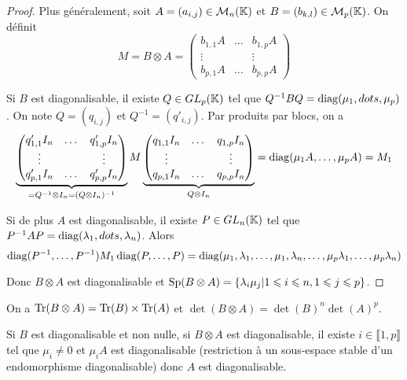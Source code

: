\documentclass[12pt]{article}
\begin{document}
\begin{proof}
	Plus généralement, soit $A=(a_{i,j})\in\mathcal{M}_{n}(\mathbb{K})$ et $B=(b_{k,l})\in\mathcal{M}_{p}(\mathbb{K})$. On définit 
	\begin{equation}
		M=B\otimes A=
		\begin{pmatrix}
			b_{1,1}A&\dots&b_{1,p}A\\
			\vdots&&\vdots\\
			b_{p,1}A&\dots&b_{p,p}A
		\end{pmatrix}
	\end{equation}

	Si $B$ est diagonalisable, il existe $Q\in GL_{p}(\mathbb{K})$ tel que $Q^{-1}BQ=\operatorname{diag}(\mu_{1},dots,\mu_{p})$. On note $Q=(q_{i,j})$ et $Q^{-1}=(q'_{i,j})$. Par produits par blocs, on a 
	\begin{equation}
		\underbrace{\begin{pmatrix}
			q'_{1,1}I_{n}&\dots&q'_{1,p}I_{n}\\
			\vdots&&\vdots\\
			q'_{p,1}I_{n}&\dots&q'_{p,p}I_{n}
		\end{pmatrix}}_{=Q^{-1}\otimes I_{n}=(Q\otimes I_{n})^{-1}}M
		\underbrace{\begin{pmatrix}
			q_{1,1}I_{n}&\dots&q_{1,p}I_{n}\\
			\vdots&&\vdots\\
			q_{p,1}I_{n}&\dots&q_{p,p}I_{n}
		\end{pmatrix}}_{Q\otimes I_{n}}
		=\operatorname{diag}(\mu_{1}A,\dots,\mu_{p}A)=M_{1}
	\end{equation}

	Si de plus $A$ est diagonalisable, il existe $P\in GL_{n}(\mathbb{K})$ tel que $P^{-1}AP=\operatorname{diag}(\lambda_{1},dots,\lambda_{n})$. Alors 
	\begin{equation}
		\operatorname{diag}(P^{-1},\dots,P^{-1})M_{1}\operatorname{diag}(P,\dots,P)=\operatorname{diag}(\mu_{1},\lambda_{1},\dots,\mu_{1},\lambda_{n},\dots,\mu_{p}\lambda_{1},\dots,\mu_{p}\lambda_{n})
	\end{equation}

	Donc $B\otimes A$ est diagonalisable et $\operatorname{Sp}(B\otimes A)=\left\lbrace \lambda_{i}\mu_{j}\middle| 1\leqslant i\leqslant n,1\leqslant j\leqslant p\right\rbrace$.
\end{proof}

\begin{remark}
	On a $\operatorname{Tr}(B\otimes A)=\operatorname{Tr}(B)\times\operatorname{Tr}(A)$ et $\det(B\otimes A)=\det(B)^{n}\det(A)^{p}$.
\end{remark}
\begin{remark}
	Si $B$ est diagonalisable et non nulle, si $B\otimes A$ est diagonalisable, il existe $i\in\llbracket1,p\rrbracket$ tel que $\mu_{i}\neq0$ et $\mu_{i}A$ est diagonalisable (restriction à un sous-espace stable d'un endomorphisme diagonalisable) donc $A$ est diagonalisable.
\end{remark}
\end{document}
